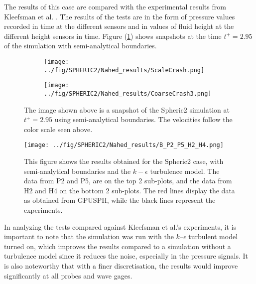 \documentclass{../GPUSPHtemplate}
\begin{document}
The results of this case are compared with the experimental results from Kleefsman et al. \citep{Kleefsman}.
The results of the tests are in the form of pressure values recorded in time at the different sensors
and in values of fluid height at the different height sensors in time.
Figure (\ref{fig:Crash}) shows snapshots at the time $t^+=2.95$ of the simulation with semi-analytical boundaries.

\begin{figure}[H]
  \begin{subfigure}[b]{0.7\linewidth}
    \centering
    \hspace*{3.3cm} \texttt{[image: ../fig/SPHERIC2/Nahed\_results/ScaleCrash.png]}
  \end{subfigure}	
  
  
  \begin{subfigure}[b]{1\linewidth}
    \centering
    \texttt{[image: ../fig/SPHERIC2/Nahed\_results/CoarseCrash3.png]} 
  \end{subfigure} 
  
  \caption{The image shown above is a snapshot of the Spheric2 simulation at $t^+ = 2.95 $ using semi-analytical boundaries.
    The velocities follow the color scale  seen above.}
  \label{fig:Crash}
\end{figure}

\begin{figure}[H]
  \centering 	
    \texttt{[image: ../fig/SPHERIC2/Nahed\_results/B\_P2\_P5\_H2\_H4.png]}
    \caption{This figure shows the results obtained for the Spheric2 case, with semi-analytical boundaries and the $k-\epsilon$ turbulence model.
      The data from P2 and P5, are on the top 2 sub-plots, and the data from H2 and H4 on the bottom 2 sub-plots.
      The red lines display the data as obtained from GPUSPH, while the black lines represent the experiments.}
\label{fig:TestpointsAll}
\end{figure}


In analyzing the tests compared against Kleefsman et al.'s experiments,
it is important to note that the simulation was run with the $k$--$\epsilon$
turbulent model turned on, which improves the results compared to a simulation without
a turbulence model since it reduces the noise, especially in the pressure signals. 
It is also noteworthy that with a finer discretisation, the results would improve significantly at all probes
and wave gages.
\end{document}
